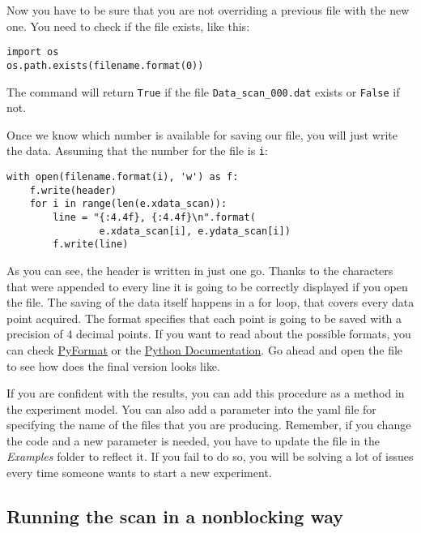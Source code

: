 Now you have to be sure that you are not overriding a previous file with
the new one. You need to check if the file exists, like this:

\begin{verbatim}
import os
os.path.exists(filename.format(0))
\end{verbatim}

The command will return \texttt{True} if the file
\texttt{Data_scan_000.dat} exists or \texttt{False} if not.


Once we know which number is available for saving our file, you will
just write the data. Assuming that the number for the file is
\texttt{i}:

\begin{verbatim}
with open(filename.format(i), 'w') as f:
    f.write(header)
    for i in range(len(e.xdata_scan)):
        line = "{:4.4f}, {:4.4f}\n".format(
                e.xdata_scan[i], e.ydata_scan[i])
        f.write(line)
\end{verbatim}

As you can see, the header is written in just one go. Thanks to the
\texttt{\n} characters that were appended to every line
it is going to be correctly displayed if you open the file. The saving
of the data itself happens in a for loop, that covers every data point
acquired. The format specifies that each point is going to be saved with
a precision of 4 decimal points. If you want to read about the possible
formats, you can check \href{https://pyformat.info/}{PyFormat} or the
\href{https://docs.python.org/3.6/library/stdtypes.html\#str.format}{Python
Documentation}. Go ahead and open the file to see how does the final
version looks like.

If you are confident with the results, you can add this procedure as a
method in the experiment model. You can also add a parameter into the
yaml file for specifying the name of the files that you are producing.
Remember, if you change the code and a new parameter is needed, you have
to update the file in the \emph{Examples} folder to reflect it. If you
fail to do so, you will be solving a lot of issues every time someone
wants to start a new experiment.

\subsection{Running the scan in a nonblocking way}\label{running-the-scan-in-a-nonblockingway}

